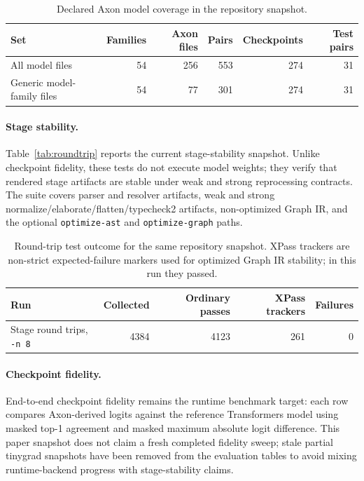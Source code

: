 \documentclass{article}
\newcommand{\code}[1]{\texttt{#1}}
\begin{document}
\begin{table}[t]
\centering
\begin{tabular}{lrrrrr}
\toprule
Set & Families & Axon files & Pairs & Checkpoints & Test pairs \\
\midrule
All model files & 54 & 256 & 553 & 274 & 31 \\
Generic model-family files & 54 & 77 & 301 & 274 & 31 \\
\bottomrule
\end{tabular}
\caption{Declared Axon model coverage in the repository snapshot.}
\label{tab:coverage}
\end{table}

\paragraph{Stage stability.}
Table~\ref{tab:roundtrip} reports the current stage-stability snapshot.  Unlike
checkpoint fidelity, these tests do not execute model weights; they verify that
rendered stage artifacts are stable under weak and strong reprocessing
contracts.  The suite covers parser and resolver artifacts, weak and strong
normalize/elaborate/flatten/typecheck2 artifacts, non-optimized Graph IR, and
the optional \code{optimize-ast} and \code{optimize-graph} paths.

\begin{table}[t]
\centering
\begin{tabular}{lrrrr}
\toprule
Run & Collected & Ordinary passes & XPass trackers & Failures \\
\midrule
Stage round trips, \code{-n 8} & 4384 & 4123 & 261 & 0 \\
\bottomrule
\end{tabular}
\caption{Round-trip test outcome for the same repository snapshot.  XPass
trackers are non-strict expected-failure markers used for optimized Graph IR
stability; in this run they passed.}
\label{tab:stage-stability}
\end{table}

\paragraph{Checkpoint fidelity.}
End-to-end checkpoint fidelity remains the runtime benchmark target: each row
compares Axon-derived logits against the reference Transformers model using
masked top-1 agreement and masked maximum absolute logit difference.  This
paper snapshot does not claim a fresh completed fidelity sweep; stale partial
tinygrad snapshots have been removed from the evaluation tables to avoid
mixing runtime-backend progress with stage-stability claims.
\end{document}
